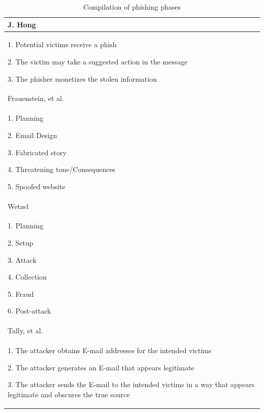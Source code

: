 \begin{flushleft}
\begin{longtable}{|>{\raggedright}p{12cm}|}
\caption{\label{tab:compilation-phases}Compilation of phishing phases}
\tabularnewline
\hline 
J. Hong \citep{hong:2012}\tabularnewline
\hline 
{\scriptsize{}1. Potential victims receive a phish}{\scriptsize \par}

{\scriptsize{}2. The victim may take a suggested action in the message}{\scriptsize \par}

{\scriptsize{}3. The phisher monetizes the stolen information}\tabularnewline
\hline 
Frauenstein, et al. \citep{frauenstein:2013}\tabularnewline
\hline 
{\scriptsize{}1. Planning}{\scriptsize \par}

{\scriptsize{}2. Email Design}{\scriptsize \par}

{\scriptsize{}3. Fabricated story}{\scriptsize \par}

{\scriptsize{}4. Threatening tone/Consequences}{\scriptsize \par}

{\scriptsize{}5. Spoofed website}\tabularnewline
\hline 
Wetzel \citep{wetzel:2005}\tabularnewline
\hline 
{\scriptsize{}1. Planning}{\scriptsize \par}

{\scriptsize{}2. Setup}{\scriptsize \par}

{\scriptsize{}3. Attack}{\scriptsize \par}

{\scriptsize{}4. Collection}{\scriptsize \par}

{\scriptsize{}5. Fraud}{\scriptsize \par}

{\scriptsize{}6. Post-attack}\tabularnewline
\hline 
Tally, et al. \citep{tally:2004}\tabularnewline
\hline 
{\scriptsize{}1. The attacker obtains E-mail addresses for the intended
victims}{\scriptsize \par}

{\scriptsize{}2. The attacker generates an E-mail that appears legitimate}{\scriptsize \par}

{\scriptsize{}3. The attacker sends the E-mail to the intended victims
in a way that appears legitimate and obscures the true source}{\scriptsize \par}


\end{longtable}
\end{flushleft}
